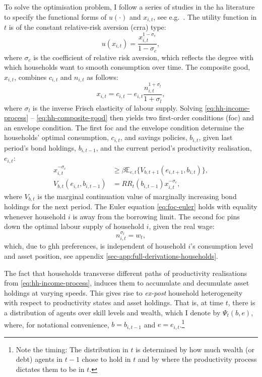 \documentclass[12pt]{article} %
\numberwithin{equation}{section} %
\begin{document}
To solve the optimisation problem, I follow a series of studies in the \Gls{ha} literature to specify the functional forms of $u( \cdot )$ and $x_{i,t}$, see e.g.~\textcite{bayer2023}. The utility function in $t$ is of the constant relative-risk aversion (\Gls{crra}) type:
\begin{equation}
    u(x_{i,t}) = \frac{x_{i,t}^{1-\sigma_c}}{1-\sigma_c}, \label{eq:hh-utility-fun}
\end{equation}
where $\sigma_c$ is the coefficient of relative risk aversion, which reflects the degree with which households want to smooth consumption over time. The composite good, $x_{i,t}$, combines $c_{i,t}$ and $n_{i,t}$ as follows:
\begin{equation}
    x_{i,t} = c_{i,t} - e_{i,t}\frac{n_{i,t}^{1+\sigma_l}}{1+\sigma_l},
    \label{eq:hh-composite-good}
\end{equation}
where $\sigma_l$ is the inverse Frisch elasticity of labour supply. Solving \eqref{eq:hh-income-process} -- \eqref{eq:hh-composite-good} then yields two first-order conditions (\Gls{foc}) and an envelope condition. The first \Gls{foc} and the envelope condition determine the households' optimal consumption, $c_{i,t}$, and savings policies, $b_{i,t}$, given last period's bond holdings, $b_{i,t-1}$, and the current period's productivity realisation, $e_{i,t}$:
\begin{align}
    x_{i,t}^{-\sigma_c} &\ge \beta \mathbb{E}_{e,t} \{ V_{b,t+1} (e_{i,t+1}, b_{i,t}) \}, \label{eq:foc-euler} \\
    V_{b,t} (e_{i,t}, b_{i,t-1}) &= RR_t (b_{i,t-1}) x_{i,t}^{-\sigma_c}, \label{eq:foc-envelope} 
\end{align}
where $V_{b,t}$ is the marginal continuation value of marginally increasing bond holdings for the next period. The Euler equation \eqref{eq:foc-euler} holds with equality whenever household $i$ is away from the borrowing limit. The second \Gls{foc} pins down the optimal labour supply of household $i$, given the real wage:
\begin{equation}
n_{i,t}^{\sigma_l} = w_t, \label{eq:foc-labour-supply}
\end{equation}
which, due to \Gls{ghh} preferences, is independent of household $i$'s consumption level and asset position, see appendix \ref{sec-app:full-derivations-households}.

The fact that households transverse different paths of productivity realisations from \eqref{eq:hh-income-process}, induces them to accumulate and decumulate asset holdings at varying speeds. This gives rise to \textit{ex-post} household heterogeneity with respect to productivity states and asset holdings. That is, at time $t$, there is a distribution of agents over skill levels and wealth, which I denote by $\Psi_t (b,e)$, where, for notational convenience, $b=b_{i,t-1}$ and $e=e_{i,t}$.\footnote{Note the timing: The distribution in $t$ is determined by how much wealth (or debt) agents in $t-1$ chose to hold in $t$ and by where the productivity process dictates them to be in $t$.}
\end{document}
